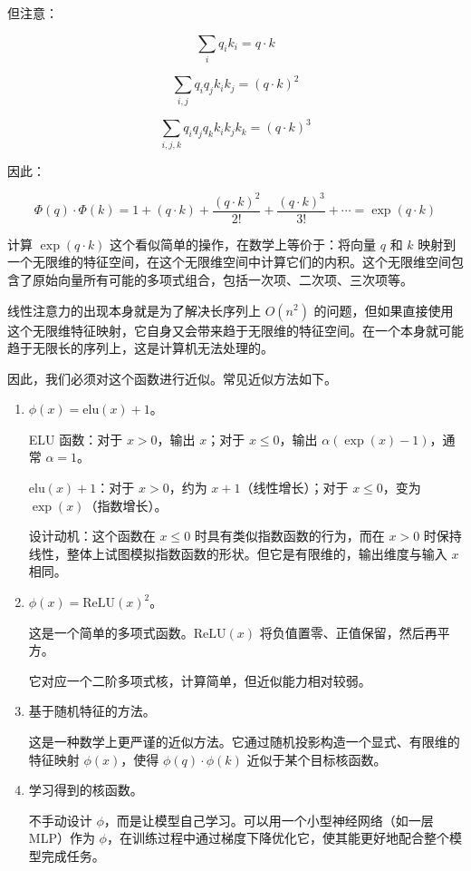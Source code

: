 但注意：

\[
\sum_i q_i k_i = q\cdot k
\]

\[
\sum_{i,j}q_i q_j k_i k_j = (q\cdot k)^2
\]

\[
\sum_{i,j,k}q_i q_j q_k k_i k_j k_k = (q\cdot k)^3
\]

因此：

\[
\Phi(q)\cdot\Phi(k)
= 1 + (q\cdot k) + \frac{(q\cdot k)^2}{2!}
+ \frac{(q\cdot k)^3}{3!}
+ \cdots
= \exp(q\cdot k)
\]

计算 \(\exp(q\cdot k)\) 这个看似简单的操作，在数学上等价于：将向量 \(q\) 和 \(k\) 映射到一个无限维的特征空间，在这个无限维空间中计算它们的内积。这个无限维空间包含了原始向量所有可能的多项式组合，包括一次项、二次项、三次项等。

线性注意力的出现本身就是为了解决长序列上 \(O(n^2)\) 的问题，但如果直接使用这个无限维特征映射，它自身又会带来趋于无限维的特征空间。在一个本身就可能趋于无限长的序列上，这是计算机无法处理的。

因此，我们必须对这个函数进行近似。常见近似方法如下。

\begin{enumerate}
\def\labelenumi{\arabic{enumi}.}
\item
  \(\phi(x)=\mathrm{elu}(x)+1\)。

  ELU 函数：对于 \(x>0\)，输出 \(x\)；对于 \(x\le 0\)，输出 \(\alpha(\exp(x)-1)\)，通常 \(\alpha=1\)。

  \(\mathrm{elu}(x)+1\)：对于 \(x>0\)，约为 \(x+1\)（线性增长）；对于 \(x\le 0\)，变为 \(\exp(x)\)（指数增长）。

  设计动机：这个函数在 \(x\le 0\) 时具有类似指数函数的行为，而在 \(x>0\) 时保持线性，整体上试图模拟指数函数的形状。但它是有限维的，输出维度与输入 \(x\) 相同。
\item
  \(\phi(x)=\mathrm{ReLU}(x)^2\)。

  这是一个简单的多项式函数。\(\mathrm{ReLU}(x)\) 将负值置零、正值保留，然后再平方。

  它对应一个二阶多项式核，计算简单，但近似能力相对较弱。
\item
  基于随机特征的方法。

  这是一种数学上更严谨的近似方法。它通过随机投影构造一个显式、有限维的特征映射 \(\phi(x)\)，使得 \(\phi(q)\cdot\phi(k)\) 近似于某个目标核函数。
\item
  学习得到的核函数。

  不手动设计 \(\phi\)，而是让模型自己学习。可以用一个小型神经网络（如一层 MLP）作为 \(\phi\)，在训练过程中通过梯度下降优化它，使其能更好地配合整个模型完成任务。
\end{enumerate}

